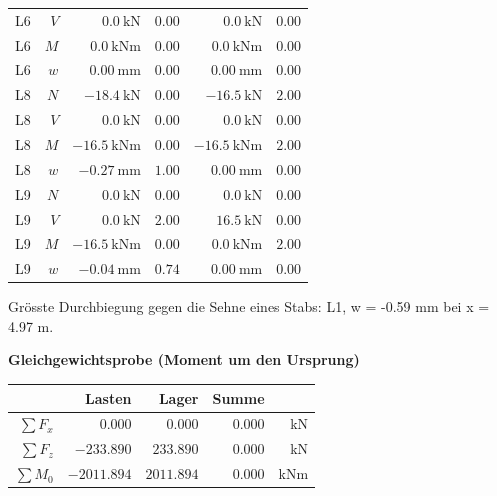 \documentclass[11pt,a4paper]{article}
\begin{document}
\begin{longtable}{rrrrrr}
L6 & $V$ & $0.0\ \mathrm{kN}$ & $0.00$ & $0.0\ \mathrm{kN}$ & $0.00$ \\
L6 & $M$ & $0.0\ \mathrm{kNm}$ & $0.00$ & $0.0\ \mathrm{kNm}$ & $0.00$ \\
L6 & $w$ & $0.00\ \mathrm{mm}$ & $0.00$ & $0.00\ \mathrm{mm}$ & $0.00$ \\
L8 & $N$ & $-18.4\ \mathrm{kN}$ & $0.00$ & $-16.5\ \mathrm{kN}$ & $2.00$ \\
L8 & $V$ & $0.0\ \mathrm{kN}$ & $0.00$ & $0.0\ \mathrm{kN}$ & $0.00$ \\
L8 & $M$ & $-16.5\ \mathrm{kNm}$ & $0.00$ & $-16.5\ \mathrm{kNm}$ & $2.00$ \\
L8 & $w$ & $-0.27\ \mathrm{mm}$ & $1.00$ & $0.00\ \mathrm{mm}$ & $0.00$ \\
L9 & $N$ & $0.0\ \mathrm{kN}$ & $0.00$ & $0.0\ \mathrm{kN}$ & $0.00$ \\
L9 & $V$ & $0.0\ \mathrm{kN}$ & $2.00$ & $16.5\ \mathrm{kN}$ & $0.00$ \\
L9 & $M$ & $-16.5\ \mathrm{kNm}$ & $0.00$ & $0.0\ \mathrm{kNm}$ & $2.00$ \\
L9 & $w$ & $-0.04\ \mathrm{mm}$ & $0.74$ & $0.00\ \mathrm{mm}$ & $0.00$ \\
\hline
\end{longtable}
Grösste Durchbiegung gegen die Sehne eines Stabs: L1, w = -0.59 mm bei x = 4.97 m.

\noindent\textbf{Gleichgewichtsprobe (Moment um den Ursprung)}
\begin{longtable}{rrrrr}
\hline
 & Lasten & Lager & Summe &  \\
\hline
\endhead
$\sum F_x$ & $0.000$ & $0.000$ & $0.000$ & kN \\
$\sum F_z$ & $-233.890$ & $233.890$ & $0.000$ & kN \\
$\sum M_0$ & $-2011.894$ & $2011.894$ & $0.000$ & kNm \\
\hline
\end{longtable}
\end{document}
